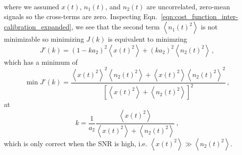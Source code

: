 where we assumed $x(t)$, $n_1(t)$, and $n_2(t)$ are uncorrelated, zero-mean signals so the cross-terms are zero.
Inspecting Eqn.~\eqref{eqn:cost_function_inter-calibration_expanded}, we see that the second term $\left\langle n_1(t)^2 \right\rangle$ is not minimizable so minimizing $J(k)$ is equivalent to minimzing
\begin{equation}
	J'(k) = \left(1-ka_2\right)^2\left\langle x(t)^2 \right\rangle + \left(ka_2\right)^2\left\langle n_2(t)^2 \right\rangle\,,
	\label{eqn:cost_function_inter-calibration_equivalent}
\end{equation} 
which has a minimum of
\begin{equation}
	\min J'(k) = \frac{\left\langle x(t)^2 \right\rangle^2 \left\langle n_2(t)^2\right\rangle + \left\langle x(t)^2 \right\rangle \left\langle n_2(t)^2\right\rangle^2}{\left[\left\langle x(t)^2\right\rangle + \left\langle n_2(t)^2\right\rangle\right]^2}\,,
\end{equation}
at
\begin{equation}
	k = \frac{1}{a_2}\frac{\left\langle x(t)^2 \right\rangle}{\left\langle x(t)^2 \right\rangle + \left\langle n_2(t)^2 \right\rangle}\,,
\end{equation}
which is only correct when the SNR is high, i.e. $\left\langle x(t)^2 \right\rangle \gg \left\langle n_2(t)^2 \right\rangle$.

